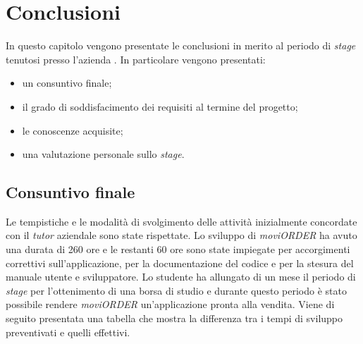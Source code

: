 
\chapter{Conclusioni}
\label{cap:conclusioni}
In questo capitolo vengono presentate le conclusioni in merito al periodo di \textit{stage} tenutosi presso l'azienda \visione{}. In particolare vengono presentati:
\begin{itemize}
	\item un consuntivo finale;
	\item il grado di soddisfacimento dei requisiti al termine del progetto;
	\item le conoscenze acquisite;
	\item una valutazione personale sullo \textit{stage}.
\end{itemize}
\section{Consuntivo finale}

Le tempistiche e le modalità di svolgimento delle attività inizialmente concordate con il \textit{tutor} aziendale sono state rispettate. Lo sviluppo di \textit{moviORDER} ha avuto una durata di 260 ore e le restanti 60 ore sono state impiegate per accorgimenti correttivi sull'applicazione, per la documentazione del codice e per la stesura del manuale utente e sviluppatore. Lo studente ha allungato di un mese il periodo di \textit{stage} per l'ottenimento di una borsa di studio e durante questo periodo è stato possibile rendere \textit{moviORDER} un'applicazione pronta alla vendita. Viene di seguito presentata una tabella che mostra la differenza tra i tempi di sviluppo preventivati e quelli effettivi.

